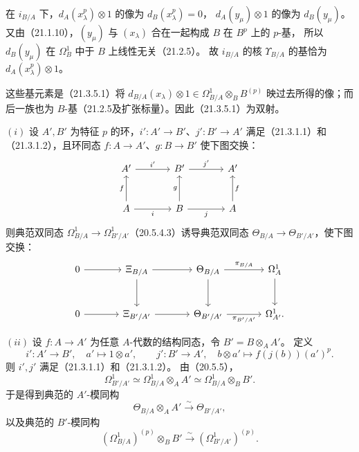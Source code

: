 在 $i_{B/A}$ 下，$d_A(x_\lambda^p)\otimes1$ 的像为 $d_B(x_\lambda^p)=0$，
$d_A(y_\mu)\otimes1$ 的像为 $d_B(y_\mu)$。
又由（21.1.10），$(y_\mu)$ 与 $(x_\lambda)$ 合在一起构成 $B$ 在 $B^p$ 上的 $p$-基，
所以 $d_B(y_\mu)$ 在 $\Omega^1_B$ 中于 $B$ 上线性无关（21.2.5）。
故 $i_{B/A}$ 的核 $\Upsilon_{B/A}$ 的基恰为 $d_A(x_\lambda^p)\otimes1$。

这些基元素是（21.3.5.1）将
$d_{B/A}(x_\lambda)\otimes1\in\Omega^1_{B/A}\otimes_B B^{(p)}$
映过去所得的像；而后一族也为 $B$-基（21.2.5及扩张标量）。因此（21.3.5.1）为双射。
\finishproof

$(i)$ 设 $A',B'$ 为特征 $p$ 的环，$i':A'\to B'$、$j':B'\to A'$
满足（21.3.1.1）和（21.3.1.2），且环同态 $f:A\to A'$、$g:B\to B'$ 使下图交换：
\[
 \begin{tikzcd}[column sep=large,row sep=large]
 A'\arrow[r,"i'"] & B'\arrow[r,"j'"] & A'\\
 A\arrow[u,"f"]\arrow[r,"i"'] & B\arrow[u,"g"]\arrow[r,"j"'] & A\arrow[u,"f"']
 \end{tikzcd}
\]
则典范双同态 $\Omega^1_{B/A}\to\Omega^1_{B'/A'}$（20.5.4.3）诱导典范双同态
$\Theta_{B/A}\to\Theta_{B'/A'}$，使下图交换：
\[
 \begin{tikzcd}[column sep=large,row sep=large]
 0\arrow[r] & \Xi_{B/A}\arrow[r]\arrow[d] &
 \Theta_{B/A}\arrow[r,"\pi_{B/A}"]\arrow[d] & \Omega^1_A\arrow[d]\\
 0\arrow[r] & \Xi_{B'/A'}\arrow[r] &
 \Theta_{B'/A'}\arrow[r,"\pi_{B'/A'}"'] & \Omega^1_{A'}.
 \end{tikzcd}
\]

$(ii)$ 设 $f:A\to A'$ 为任意 $A$-代数的结构同态，令 $B'=B\otimes_A A'$。
定义
\[
 i':A'\to B',\quad a'\mapsto1\otimes a',
 \qquad
 j':B'\to A',\quad b\otimes a'\mapsto f(j(b))(a')^p.
\]
则 $i',j'$ 满足（21.3.1.1）和（21.3.1.2）。
由（20.5.5），
\[
 \Omega^1_{B'/A'}\simeq\Omega^1_{B/A}\otimes_A A'
 \simeq\Omega^1_{B/A}\otimes_B B'.
\]
于是得到典范的 $A'$-模同构
\begin{equation}
 \Theta_{B/A}\otimes_A A'\xrightarrow{\sim}\Theta_{B'/A'},
 \tag{21.3.6.1}
\end{equation}
以及典范的 $B'$-模同构
\begin{equation}
 (\Omega^1_{B/A})^{(p)}\otimes_B B'
 \xrightarrow{\sim}(\Omega^1_{B'/A'})^{(p)}.
 \tag{21.3.6.2}
\end{equation}
